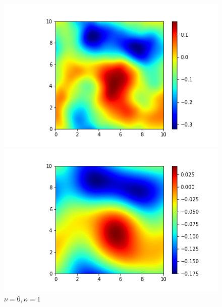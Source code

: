 \documentclass{article}
\begin{document}
\begin{figure}[H]
\begin{minipage}[t]{0.3\textwidth}
    \caption*{$\nu=2, \kappa=1$}
  \end{minipage}

\begin{minipage}[t]{0.3\textwidth}  %
    \centering
    \includegraphics[width=\textwidth]{./pics/2D_NeuralRF_256_10.0_3_1.png}  %
    \caption*{$\nu=3, \kappa=1$}
  \end{minipage}
  \begin{minipage}[t]{0.3\textwidth} 
    \centering
    \includegraphics[width=\textwidth]{./pics/2D_NeuralRF_256_10.0_6_1.png} 
    \caption*{$\nu=6, \kappa=1$}
  \end{minipage}
  \begin{minipage}[t]{0.3\textwidth}
    \centering

\end{minipage}
\end{figure}
\end{document}

